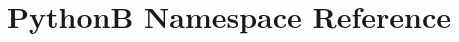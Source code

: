 \hypertarget{namespace_python_b}{}\section{Python\+B Namespace Reference}
\label{namespace_python_b}
